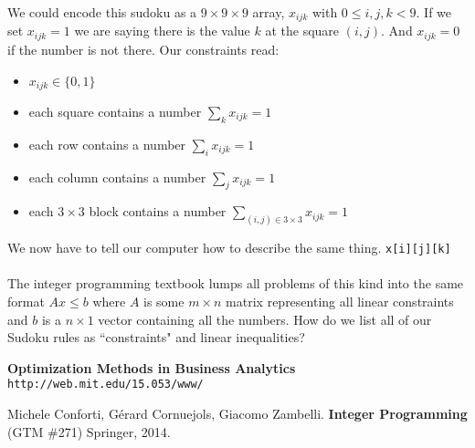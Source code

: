 \documentclass[12pt]{article}
\begin{document}
We could encode this sudoku as a $9 \times 9 \times 9$ array, $x_{ijk}$ with $0 \leq i,j,k < 9$.  If we set $x_{ijk} = 1$ we are saying there is the value $k$ at the square $(i,j)$.  And $x_{ijk}=0$ if the number is not there. Our constraints read:
\begin{itemize}
\item $x_{ijk} \in \{ 0,1\}$
\item each square contains a number $\displaystyle \sum_{k} x_{ijk} = 1$
\item each row contains a number $\displaystyle \sum_{i} x_{ijk} = 1$
\item each column contains a number $\displaystyle \sum_{j} x_{ijk} = 1$
\item each $3 \times 3$ block contains a number $\displaystyle \sum_{(i,j) \in 3 \times 3} x_{ijk}=1$
\end{itemize} 
We now have to tell our computer how to describe the same thing.  \texttt{x[i][j][k]} \\ \\
The integer programming textbook lumps all problems of this kind into the same format $Ax \leq b$ where $A$ is some $m \times n$ matrix representing all linear constraints and $b$ is a $n \times 1$ vector containing all the numbers.  How do we list all of our Sudoku rules as ``constraints" and linear inequalities?

\newpage

\noindent {}

\vfill
\begin{thebibliography}{} 
\item \textbf{Optimization Methods in Business Analytics} \texttt{http://web.mit.edu/15.053/www/}
\item Michele Conforti, G\'{e}rard Cornuejols, Giacomo Zambelli. \textbf{Integer Programming} (GTM \#271) Springer, 2014.
\end{thebibliography}
\end{document}

